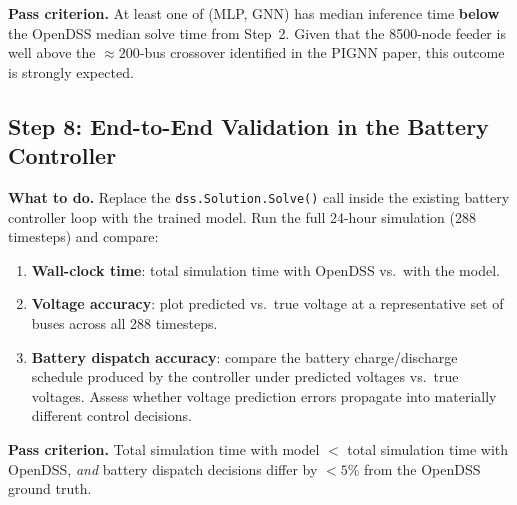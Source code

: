 \documentclass[11pt]{article}
\begin{document}
\noindent\textbf{Pass criterion.}
At least one of (MLP, GNN) has median inference time \textbf{below} the
OpenDSS median solve time from Step~2.  Given that the 8500-node feeder
is well above the ${\approx}200$-bus crossover identified in the PIGNN
paper, this outcome is strongly expected.

\subsection{Step 8: End-to-End Validation in the Battery Controller}
\label{subsec:step8}

\noindent\textbf{What to do.}
Replace the \texttt{dss.Solution.Solve()} call inside the existing battery
controller loop with the trained model.  Run the full 24-hour simulation
(288 timesteps) and compare:

\begin{enumerate}[itemsep=2pt]
  \item \textbf{Wall-clock time}: total simulation time with OpenDSS vs.\
    with the model.
  \item \textbf{Voltage accuracy}: plot predicted vs.\ true voltage at
    a representative set of buses across all 288 timesteps.
  \item \textbf{Battery dispatch accuracy}: compare the battery charge/discharge
    schedule produced by the controller under predicted voltages vs.\ true
    voltages.  Assess whether voltage prediction errors propagate into
    materially different control decisions.
\end{enumerate}

\noindent\textbf{Pass criterion.}
Total simulation time with model $<$ total simulation time with OpenDSS,
\emph{and} battery dispatch decisions differ by $<5\%$ from the OpenDSS
ground truth.
\end{document}
